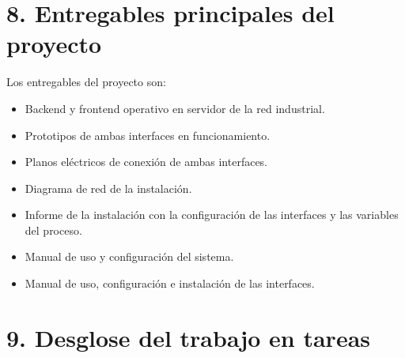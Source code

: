 \documentclass[
11pt, %
]{charter}
\begin{document}


\section{8. Entregables principales del proyecto}
\label{sec:entregables}

Los entregables del proyecto son:

\begin{itemize}
	\item Backend y frontend operativo en servidor de la red industrial.
	\item Prototipos de ambas interfaces en funcionamiento.
	\item Planos eléctricos de conexión de ambas interfaces.
	\item Diagrama de red de la instalación.
	\item Informe de la instalación con la configuración de las interfaces y las variables del proceso.
	\item Manual de uso y configuración del sistema.
	\item Manual de uso, configuración e instalación de las interfaces.
		
\end{itemize}


\section{9. Desglose del trabajo en tareas}
\label{sec:wbs}
\end{document}
